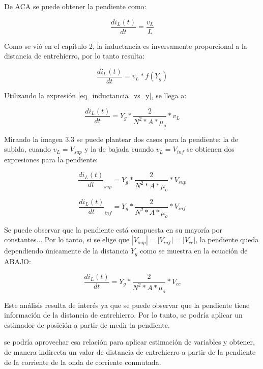 De ACA se puede obtener la pendiente como:

\begin{equation} \label{eq_corriente_taylor_2}
	\frac{di_L(t)}{dt}= \frac{v_L}{L}
\end{equation}


Como se vió en el capítulo 2, la inductancia es inversamente proporcional a la distancia de entrehierro, por lo tanto resulta:

\begin{equation} \label{eq_corriente_taylor_2}
	\frac{di_L(t)}{dt}= v_L*f(Y_g)
\end{equation}

Utilizando la expresión \ref{eq_inductancia_vs_y}, se llega a:

\begin{equation} \label{eq_corriente_taylor_2}
	\frac{di_L(t)}{dt}= Y_g*\frac{2}{N^2*A*\mu_o}*v_L
\end{equation}

Mirando la imagen 3.3 se puede plantear dos casos para la pendiente: la de subida, cuando $v_L=V_{sup}$ y la de bajada cuando $v_L=V_{inf}$ se obtienen dos expresiones para la pendiente:

\begin{equation} \label{eq_corriente_taylor_2}
	\frac{di_L(t)}{dt}_{sup}= Y_g*\frac{2}{N^2*A*\mu_o}*V_{sup}
\end{equation}


\begin{equation} \label{eq_corriente_taylor_2}
	\frac{di_L(t)}{dt}_{inf}= Y_g*\frac{2}{N^2*A*\mu_o}*V_{inf}
\end{equation}



Se puede observar que la pendiente está compuesta en su mayoría por constantes... Por lo tanto, si se elige que $|V_{sup}|=|V_{inf}|=|V_{cc}|$, la pendiente queda dependiendo únicamente de la distancia $Y_g$ como se muestra en la ecuación de ABAJO:

\begin{equation} \label{eq_corriente_taylor_2}
	\frac{di_L(t)}{dt}= Y_g*\frac{2}{N^2*A*\mu_o}*V_{cc}
\end{equation}


Este análisis resulta de interés ya que se puede observar que la pendiente tiene información de la distancia de entrehierro. Por lo tanto, se podría aplicar un estimador de posición a partir de medir la pendiente.

 se podría aprovechar esa relación para aplicar estimación de variables y obtener, de manera indirecta un valor de distancia de entrehierro a partir de la pendiente de la corriente de la onda de corriente conmutada.

